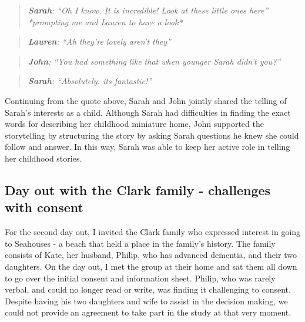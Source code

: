 \begin{quote}
\textit{    \textbf{Sarah}: ``Oh I know. It is incredible! Look at these little ones here'' *prompting me and Lauren to have a look*}

\end{quote}

\begin{quote}
\textit{    \textbf{Lauren}: ``Ah they're lovely aren't they''
}
\end{quote}

\begin{quote}
\textit{    \textbf{John}: ``You had something like that when younger Sarah didn't you?''
}
\end{quote}

\begin{quote}
\textit{    \textbf{Sarah}: ``Absolutely. its fantastic!''
}
\end{quote}

Continuing from the quote above, Sarah and John jointly shared the telling of Sarah's interests as a child. Although Sarah had difficulties in finding the exact words for describing her childhood miniature home, John supported the storytelling by structuring the story by asking Sarah questions he knew she could follow and answer. In this way, Sarah was able to keep her active role in telling her childhood stories.


\subsection{Day out with the Clark family - challenges with consent}
\label{ClarkFamily}
For the second day out, I invited the Clark family who expressed interest in going to Seahouses - a beach that held a place in the family's history. The family consists of Kate, her husband, Philip, who has advanced dementia, and their two daughters. On the day out, I met the group at their home and sat them all down to go over the initial consent and information sheet. Philip, who was rarely verbal, and could no longer read or write, was finding it challenging to consent. Despite having his two daughters and wife to assist in the decision making, we could not provide an agreement to take part in the study at that very moment. 

